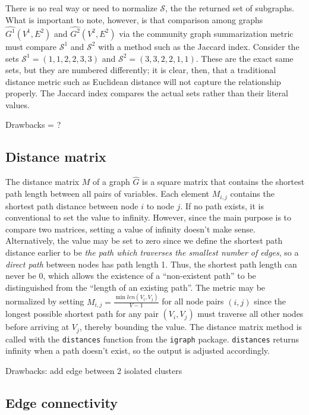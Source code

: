There is no real way or need to normalize $\mathcal{S}$, the the returned set 
of subgraphs. What is important to note, however, is that comparison among 
graphs $\hat{G^1}(V^1,E^2)$ and $\hat{G^2}(V^2,E^2)$ via the community graph 
summarization metric 
must compare $\mathcal{S}^1$ and $\mathcal{S}^2$ with a method such as the 
Jaccard index. Consider the sets $\mathcal{S}^1=(1,1,2,2,3,3)$ and 
$\mathcal{S}^2=(3,3,2,2,1,1)$. These are 
the exact same sets, but they are numbered differently; it is clear, then, that 
a traditional distance metric such as Euclidean distance will not capture the 
relationship properly. The Jaccard index compares the actual sets rather than 
their literal values.

Drawbacks = ?

\subsection{Distance matrix}

The distance matrix $M$ of a graph $\hat{G}$ is a square matrix that 
contains the shortest path length 
between all pairs of variables. Each element $M_{i,j}$ 
contains the shortest path distance between node $i$ to node $j$. If no path 
exists, it is conventional to set the value to infinity. However, since the 
main purpose is to compare two matrices, 
setting a value of infinity doesn't make sense. Alternatively, the value may be 
set to zero since we define the shortest path distance earlier to be 
\textit{the path which traverses the smallest number of edges}, so a 
\textit{direct path} between nodes has path length 1. Thus, the shortest path 
length can never be 0, which allows the existence of a ``non-existent path'' to 
be distinguished from the ``length of an existing path''. The metric may be 
normalized by setting $M_{i,j} = \frac{\min len(V_i,V_j)}{V-1}$ for all node 
pairs $(i,j)$ since the longest possible shortest path for any pair 
$(V_i,V_j)$ must traverse all other nodes before arriving at $V_j$, thereby 
bounding the value.
The distance matrix method is called with the \texttt{distances} function from 
the \texttt{igraph} package. \texttt{distances} returns infinity when a path 
doesn't exist, so the output is adjusted accordingly.

Drawbacks: add edge between 2 isolated clusters

\subsection{Edge connectivity}

